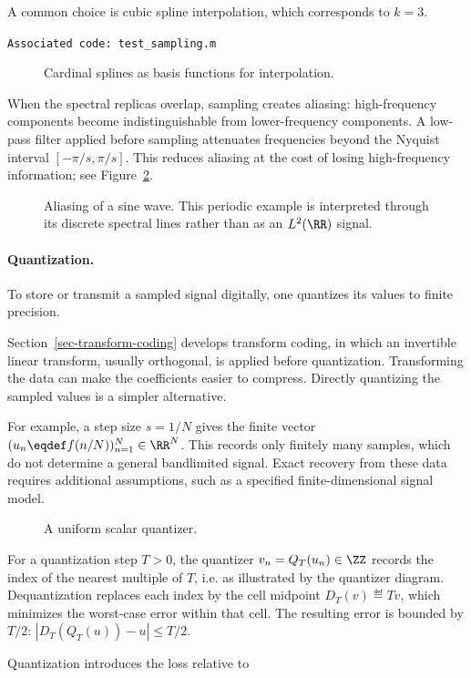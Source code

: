 A common choice is cubic spline interpolation, which corresponds to $k=3$.

\texttt{Associated code: test\_sampling.m}

\begin{figure}[tbp]
\centering
{}
\caption{Cardinal splines as basis functions for interpolation.}
\label{fig-sampling-splines}
\end{figure}



When the spectral replicas overlap, sampling creates aliasing: high-frequency components become indistinguishable from lower-frequency components. A low-pass filter applied before sampling attenuates frequencies beyond the Nyquist interval $[-\pi/s,\pi/s]$. This reduces aliasing at the cost of losing high-frequency information; see Figure~\ref{fig-aliasing}.

\begin{figure}[tbp]
\centering
{}
\caption{Aliasing of a sine wave. This periodic example is interpreted through its discrete spectral lines rather than as an $L^2(\RR)$ signal.}
\label{fig-aliasing}
\end{figure}

   
\paragraph{Quantization.}

To store or transmit a sampled signal digitally, one quantizes its values to finite precision.
  
Section~\ref{sec-transform-coding} develops transform coding, in which an invertible linear transform, usually orthogonal, is applied before quantization. Transforming the data can make the coefficients easier to compress. Directly quantizing the sampled values is a simpler alternative.

For example, a step size $s=1/N$ gives the finite vector $(u_n \eqdef f(n/N))_{n=1}^{N} \in \RR^N$. This records only finitely many samples, which do not determine a general bandlimited signal. Exact recovery from these data requires additional assumptions, such as a specified finite-dimensional signal model.

\begin{figure}[tbp]
\centering
{}
\caption{A uniform scalar quantizer.}
\label{fig-review-shannon-quantizer}
\end{figure}

For a quantization step $T>0$, the quantizer $v_n = Q_T(u_n) \in \ZZ$ records the index of the nearest multiple of $T$, i.e.
as illustrated by the quantizer diagram. Dequantization replaces each index by the cell midpoint $D_T(v) \eqdef T v$, which minimizes the worst-case error within that cell. The resulting error is bounded by $T/2$: $|D_T(Q_T(u))-u| \leq T/2$.
 
Quantization introduces the loss relative to 